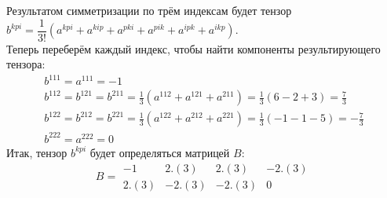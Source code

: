 \documentclass{article}
\begin{document}
\begin{center}
Результатом симметризации по трём индексам будет тензор $b^{kpi} = \dfrac{1}{3!}\left (a^{kpi} + a^{kip} + a^{pki} + a^{pik} + a^{ipk} + a^{ikp}\right )$. \\
Теперь переберём каждый индекс, чтобы найти компоненты результирующего тензора:
\begin{gather*}
b^{111} = a^{111} = -1 \\
b^{112} = b^{121} = b^{211} = \frac{1}{3}\left(a^{112} + a^{121} + a^{211}\right) = \frac{1}{3}(6 - 2 + 3) = \frac{7}{3} \\
b^{122} = b^{212} = b^{221} = \frac{1}{3}\left(a^{122} + a^{212} + a^{221}\right) = \frac{1}{3}(-1 - 1 - 5) = -\frac{7}{3} \\
b^{222} = a^{222} = 0
\end{gather*}
Итак, тензор $b^{kpi}$ будет определяться матрицей $B$:
$$B = \begin{array}{||cc|cc||}
-1 & 2.(3) & 2.(3) & -2.(3) \\
2.(3) & -2.(3) & -2.(3) & 0
\end{array}$$
\end{center}
\end{document}
